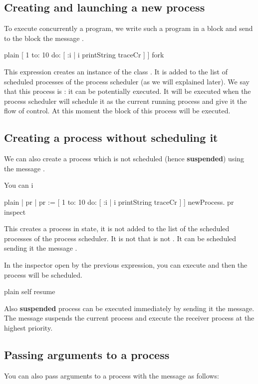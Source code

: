 \documentclass[10pt,twoside,english]{_support/latex/sbabook/sbabook}
\begin{document}
\subsection{Creating and launching a new process}
To execute concurrently a program, we write such a program in a block and send to the block the message .

\begin{displaycode}{plain}
[ 1 to: 10 do: [ :i | i  printString traceCr ] 
	] fork
\end{displaycode}

This expression creates an instance of the class . 
It is added to the list of scheduled processes of the process scheduler (as we will explained later). 
We say that this process is : 
it can be potentially executed. 
It will be executed when the process scheduler will schedule it as the current running process and give it the flow of control.
At this moment the block of this process will be executed.
\subsection{Creating a process without scheduling it}
We can also create a process which is not scheduled (hence \textbf{suspended}) using the message .

You can i

\begin{displaycode}{plain}
| pr |
pr := [ 1 to: 10 do: [ :i |
   i  printString traceCr ] ] newProcess.
pr inspect
\end{displaycode}

This creates a process in  state, it is not added to the list of the scheduled processes of the process scheduler. 
It is not that is not . It can be scheduled sending it the message .

In the inspector open by the previous expression, you can execute  and then the process will be scheduled. 

\begin{displaycode}{plain}
self resume
\end{displaycode}

Also \textbf{suspended} process can be executed immediately by sending it the  message.
The message  suspends the current process and execute the receiver process at the highest priority.
\subsection{Passing arguments to a process}
You can also pass arguments to a process with the message  as follows:
\end{document}
